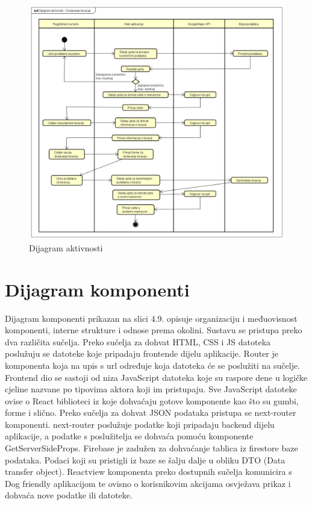 			
			\begin{figure}[H]
			\includegraphics[scale=0.4]{slike/DijagramAktivnosti.png}
			\centering
			\caption{Dijagram aktivnosti}
			\label{fig:promjene}
				\end{figure}

            \section{Dijagram komponenti}

			Dijagram komponenti prikazan na slici 4.9. opisuje organizaciju i međuovisnost komponenti, interne strukture i odnose prema okolini. Sustavu se pristupa preko dva različita sučelja. Preko sučelja za dohvat HTML, CSS i JS datoteka poslužuju se datoteke koje pripadaju frontende dijelu aplikacije. Router je komponenta koja na upis s url određuje koja datoteka će se poslužiti na sučelje. Frontend dio se sastoji od niza JavaScript datoteka koje su raspore dene u logičke cjeline nazvane po tipovima aktora koji im pristupaju. Sve JavaScript datoteke ovise o React biblioteci iz koje dohvaćaju gotove komponente kao što su gumbi, forme i slično. Preko sučelja za dohvat JSON podataka pristupa se next-router komponenti. next-router poslužuje podatke koji pripadaju backend dijelu aplikacije, a podatke s poslužitelja se dohvaća pomoću komponente GetServerSideProps. Firebase je zadužen za dohvaćanje tablica iz firestore baze podataka. Podaci koji su pristigli iz baze se šalju dalje u obliku DTO (Data transfer object). Reactview komponenta preko dostupnih sučelja komunicira s Dog friendly aplikacijom te ovisno o korisnikovim akcijama osvježava prikaz i dohvaća nove podatke ili datoteke.
			
